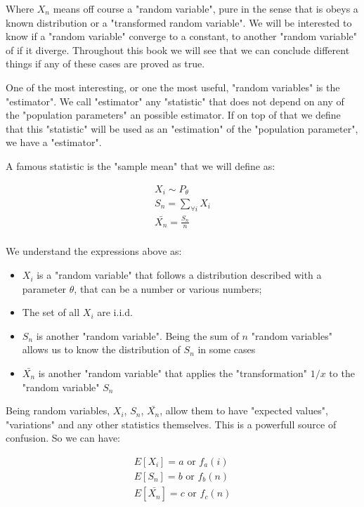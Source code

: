 \documentclass[10pt,a4paper]{book}
\begin{document}
Where $X_n$ means off course a "random variable", pure in the sense that is obeys a known distribution or a "transformed random variable". We will be interested to know if a "random variable" converge to a constant, to another "random variable" of if it diverge. Throughout this book we will see that we can conclude different things if any of these cases are proved as true.

One of the most interesting, or one the most useful, "random variables" is the "estimator". We call "estimator" any "statistic" that does not depend on any of the "population parameters" an possible estimator. If on top of that we define that this "statistic" will be used as an "estimation" of the "population parameter", we have a "estimator".

A famous statistic is the "sample mean" that we will define as:

\begin{align*}
	X_i \sim P_{\theta}\\
	S_n = \sum_{\forall i}{X_i}\\
	\bar{X_{n}} = \frac{S_n}{n}\\
\end{align*}

We understand the expressions above as:
\begin{itemize}
	\item {$X_i$ is a "random variable" that follows a distribution described with a parameter $\theta$, that can be a number or various numbers;}
	\item {The set of all $X_i$ are i.i.d.}
	\item {$S_n$ is another "random variable". Being the sum of $n$ "random variables" allows us to know the distribution of $S_n$ in some cases}
	\item {$\bar{X_{n}}$ is another "random variable" that applies the "transformation" $1/x$ to the "random variable" $S_n$}
\end{itemize}

Being random variables, $X_i$, $S_n$, $\bar{X_{n}}$, allow them to have "expected values", "variations" and any other statistics themselves. This is a powerfull source of confusion. So we can have:

\begin{align*}
	E[X_i] = a \text{ or } f_a(i)\\	
	E[S_n] = b \text{ or } f_b(n)\\
	E[\bar{X_{n}}] = c \text{ or } f_c(n)\\
\end{align*}
\end{document}

